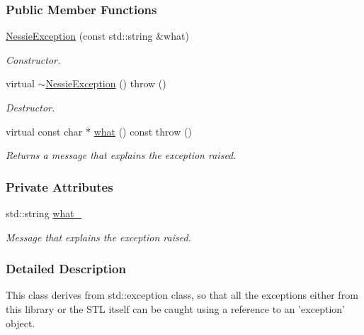 \subsubsection*{Public Member Functions}
\begin{CompactItemize}
\item 
\hyperlink{class_nessie_exception_80c86c892438045635bf6a99da17e859}{NessieException} (const std::string \&what)
\begin{CompactList}\small\item\em Constructor. \item\end{CompactList}\item 
virtual \hyperlink{class_nessie_exception_19f44d2725dd53e2f10505a88e5773f2}{$\sim$NessieException} ()  throw ()
\begin{CompactList}\small\item\em Destructor. \item\end{CompactList}\item 
virtual const char $\ast$ \hyperlink{class_nessie_exception_a522c2ea164e88be0b26670170b33909}{what} () const   throw ()
\begin{CompactList}\small\item\em Returns a message that explains the exception raised. \item\end{CompactList}\end{CompactItemize}
\subsubsection*{Private Attributes}
\begin{CompactItemize}
\item 
\hypertarget{class_nessie_exception_3464c36d30d9baabd0b10ac4797d4b5b}{
std::string \hyperlink{class_nessie_exception_3464c36d30d9baabd0b10ac4797d4b5b}{what\_\-}}
\label{class_nessie_exception_3464c36d30d9baabd0b10ac4797d4b5b}

\begin{CompactList}\small\item\em Message that explains the exception raised. \item\end{CompactList}\end{CompactItemize}


\subsubsection{Detailed Description}
This class derives from std::exception class, so that all the exceptions either from this library or the STL itself can be caught using a reference to an 'exception' object.

